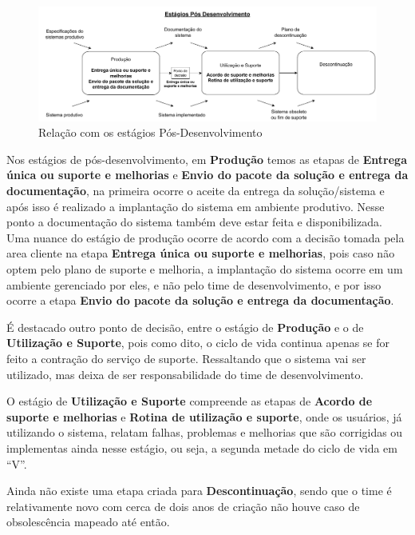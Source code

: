 	\begin{figure}[h]
		\centering
		\includegraphics[width=\textwidth]{./figuras/currentPostDevelopment.pdf}
		\caption{Relação com os estágios Pós-Desenvolvimento}
		\label{fig:metodologia:currentPostDevelopmentPhases}
	\end{figure}

	Nos estágios de pós-desenvolvimento, em \textbf{Produção} temos as etapas de \textbf{Entrega única ou suporte e melhorias} e \textbf{Envio do pacote da solução e entrega da documentação},
	na primeira ocorre o aceite da entrega da solução/sistema e após isso é realizado a implantação do sistema em ambiente produtivo.
	Nesse ponto a documentação do sistema também deve estar feita e disponibilizada. Uma nuance do estágio de produção ocorre de acordo com a decisão tomada pela area cliente na etapa \textbf{Entrega única ou suporte e melhorias}, pois caso não optem
	pelo plano de suporte e melhoria, a implantação do sistema ocorre em um ambiente gerenciado por eles, e não pelo time de desenvolvimento, e por isso ocorre a etapa \textbf{Envio do pacote da solução e entrega da documentação}.

	É destacado outro ponto de decisão, entre o estágio de \textbf{Produção} e o de \textbf{Utilização e Suporte}, pois como dito, o ciclo de vida continua apenas se for feito a contração do serviço de suporte.
	Ressaltando que o sistema vai ser utilizado, mas deixa de ser responsabilidade do time de desenvolvimento.

	O estágio de \textbf{Utilização e Suporte} compreende as etapas de \textbf{Acordo de suporte e melhorias} e \textbf{Rotina de utilização e suporte}, onde os usuários, já utilizando o sistema, relatam falhas, problemas e melhorias que são corrigidas
	ou implementas ainda nesse estágio, ou seja, a segunda metade do ciclo de vida em ``V''.

	Ainda não existe uma etapa criada para \textbf{Descontinuação}, sendo que o time é relativamente novo com cerca de dois anos de criação
	não houve caso de obsolescência mapeado até então.

